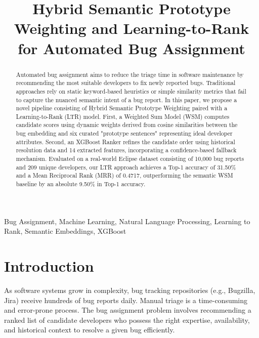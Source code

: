 \documentclass[conference]{IEEEtran}
\begin{document}
\title{Hybrid Semantic Prototype Weighting and Learning-to-Rank for Automated Bug Assignment\\
}

\author{
}

\maketitle

\begin{abstract}
Automated bug assignment aims to reduce the triage time in software maintenance by recommending the most suitable developers to fix newly reported bugs. Traditional approaches rely on static keyword-based heuristics or simple similarity metrics that fail to capture the nuanced semantic intent of a bug report. In this paper, we propose a novel pipeline consisting of Hybrid Semantic Prototype Weighting paired with a Learning-to-Rank (LTR) model. First, a Weighted Sum Model (WSM) computes candidate scores using dynamic weights derived from cosine similarities between the bug embedding and six curated "prototype sentences" representing ideal developer attributes. Second, an XGBoost Ranker refines the candidate order using historical resolution data and 14 extracted features, incorporating a confidence-based fallback mechanism. Evaluated on a real-world Eclipse dataset consisting of 10,000 bug reports and 209 unique developers, our LTR approach achieves a Top-1 accuracy of 31.50\% and a Mean Reciprocal Rank (MRR) of 0.4717, outperforming the semantic WSM baseline by an absolute 9.50\% in Top-1 accuracy.
\end{abstract}

\begin{IEEEkeywords}
Bug Assignment, Machine Learning, Natural Language Processing, Learning to Rank, Semantic Embeddings, XGBoost
\end{IEEEkeywords}

\section{Introduction}
As software systems grow in complexity, bug tracking repositories (e.g., Bugzilla, Jira) receive hundreds of bug reports daily. Manual triage is a time-consuming and error-prone process. The bug assignment problem involves recommending a ranked list of candidate developers who possess the right expertise, availability, and historical context to resolve a given bug efficiently. 
\end{document}
